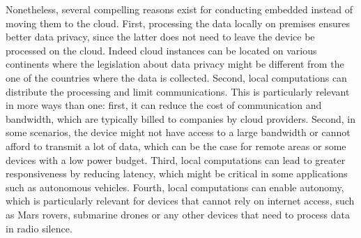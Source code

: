 Nonetheless, several compelling reasons exist for conducting embedded
\DIFdelbegin {}\DIFdelend \DIFaddbegin {}\DIFaddend instead of moving them to the cloud. First, processing the data
locally on premises ensures better data privacy, since the latter does not need
to leave the device \DIFdelbegin {}\DIFdelend \DIFaddbegin {}\DIFaddend be processed on the cloud. Indeed cloud instances can be
located on various continents \DIFaddbegin {}\DIFaddend where the legislation about data
privacy might be different from the one of the countries where the data is
collected. Second, local computations can distribute the processing and limit
communications. This is particularly relevant in more ways than one: first, it
can reduce the cost of communication and bandwidth, which are typically billed
to companies by cloud providers. Second, in some scenarios, the device might not
have access to a large bandwidth or cannot afford to transmit a lot of data,
which can be the case for remote areas or some devices with a low power budget.
Third, local computations can lead to greater responsiveness by reducing
latency, which might be critical in some applications such as autonomous
vehicles. Fourth, local computations can enable autonomy, which is particularly
relevant for devices that cannot rely on internet access, such as Mars rovers,
submarine drones or any other devices that need to process data in radio
silence.\\

